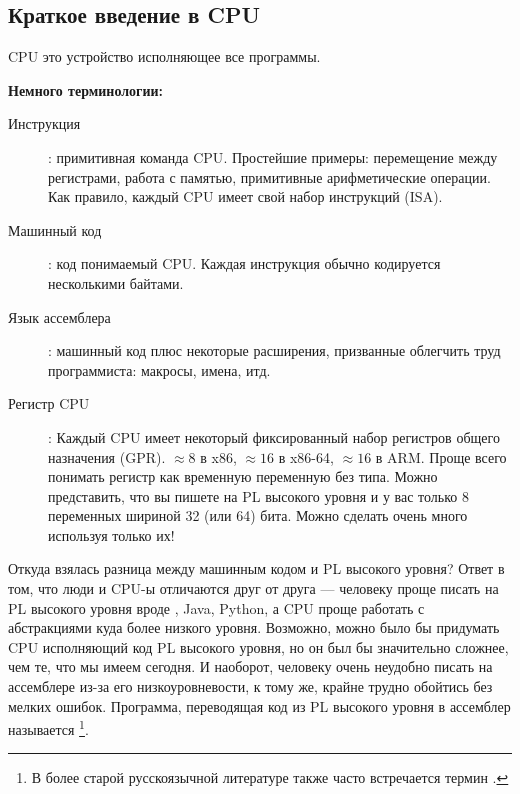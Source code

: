 \subsection{Краткое введение в CPU}

\ac{CPU} это устройство исполняющее все программы.

\textbf{Немного терминологии:}

\begin{description}
\item[Инструкция]: примитивная команда \ac{CPU}.
Простейшие примеры: перемещение между регистрами, работа с памятью, примитивные арифметические операции.
Как правило, каждый \ac{CPU} имеет свой набор инструкций (\ac{ISA}).

\item[Машинный код]: код понимаемый \ac{CPU}. 
Каждая инструкция обычно кодируется несколькими байтами.
\item[Язык ассемблера]: машинный код плюс некоторые расширения, призванные облегчить труд программиста: макросы, имена, итд.
\item[Регистр CPU]: Каждый \ac{CPU} имеет некоторый фиксированный набор регистров общего назначения (\ac{GPR}).
$\approx 8$ в x86, $\approx 16$ в x86-64, $\approx 16$ в ARM.
Проще всего понимать регистр как временную переменную без типа.
Можно представить, что вы пишете на \ac{PL} высокого уровня и у вас только 8 переменных шириной 32 (или 64) бита.
Можно сделать очень много используя только их!
\end{description}


Откуда взялась разница между машинным кодом и \ac{PL} высокого уровня?  Ответ в том, что люди и \ac{CPU}-ы отличаются друг от друга ---
человеку проще писать на \ac{PL} высокого уровня вроде \CCpp, Java, Python, а \ac{CPU} проще работать с абстракциями куда более низкого уровня.
Возможно, можно было бы придумать \ac{CPU} исполняющий код \ac{PL} высокого уровня, но он был бы значительно сложнее, чем те, что мы имеем сегодня.
И наоборот, человеку очень неудобно писать на ассемблере из-за его низкоуровневости, к тому же, крайне трудно обойтись без мелких ошибок.
Программа, переводящая код из \ac{PL} высокого уровня в ассемблер называется 
\footnote{В более старой русскоязычной литературе также часто встречается термин .}.

%
%
%

